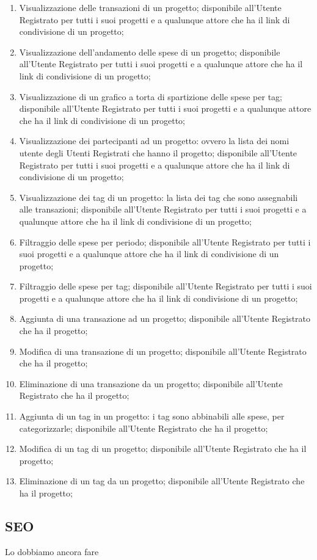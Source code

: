 \begin{enumerate}
    \item Visualizzazione delle transazioni di un progetto; disponibile all'Utente Registrato per tutti i suoi progetti e a qualunque attore che ha il link di condivisione di un progetto;

    \item Visualizzazione dell'andamento delle spese di un progetto;
    disponibile all'Utente Registrato per tutti i suoi progetti e a qualunque attore che ha il link di condivisione di un progetto;

    \item Visualizzazione di un grafico a torta di spartizione delle spese per tag;  disponibile all'Utente Registrato per tutti i suoi progetti e a qualunque attore che ha il link di condivisione di un progetto;

    \item Visualizzazione dei partecipanti ad un progetto: ovvero la lista dei nomi utente degli Utenti Registrati che hanno il progetto;
    disponibile all'Utente Registrato per tutti i suoi progetti e a qualunque attore che ha il link di condivisione di un progetto;

    \item Visualizzazione dei tag di un progetto: la lista dei tag che sono assegnabili alle transazioni; disponibile all'Utente Registrato per tutti i suoi progetti e a qualunque attore che ha il link di condivisione di un progetto;

    \item Filtraggio delle spese per periodo; disponibile all'Utente Registrato per tutti i suoi progetti e a qualunque attore che ha il link di condivisione di un progetto;

    \item Filtraggio delle spese per tag; disponibile all'Utente Registrato per tutti i suoi progetti e a qualunque attore che ha il link di condivisione di un progetto;
     
    \item Aggiunta di una transazione ad un progetto; disponibile all'Utente Registrato che ha il progetto;

    \item Modifica di una transazione di un progetto; disponibile all'Utente Registrato che ha il progetto;

    \item Eliminazione di una transazione da un progetto; disponibile all'Utente Registrato che ha il progetto;

    \item Aggiunta di un tag in un progetto: i tag sono abbinabili alle spese, per categorizzarle; disponibile all'Utente Registrato che ha il progetto;

    \item Modifica di un tag di un progetto; disponibile all'Utente Registrato che ha il progetto;

    \item Eliminazione di un tag da un progetto; disponibile all'Utente Registrato che ha il progetto;
\end{enumerate}

\subsection{SEO}

Lo dobbiamo ancora fare